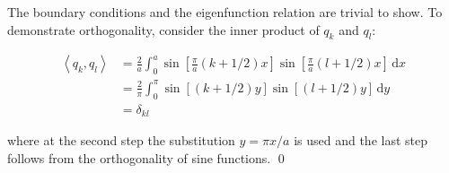 \documentclass[12pt]{article}
\begin{document}

The boundary conditions and the eigenfunction relation are trivial to show. To demonstrate orthogonality, consider the inner product of $q_{k}$ and $q_{l}$:

\begin{equation}
\begin{split}
    \left\langle q_{k}, q_{l} \right\rangle &= \frac{2}{a} \int_{0}^{a} \sin{\left[ \frac{\pi}{a} (k + 1/2) x \right]} \sin{\left[ \frac{\pi}{a} (l + 1/2) x \right]} \, \mathrm{d}x \\
    &= \frac{2}{\pi} \int_{0}^{\pi} \sin{\left[ (k + 1/2) y \right]} \sin{\left[ (l + 1/2) y \right]} \, \mathrm{d}y \\
    &= \delta_{kl}
\end{split}
\end{equation}

where at the second step the substitution $y = \pi x/a$ is used and the last step follows from the orthogonality of sine functions.
\qed
\end{document}
